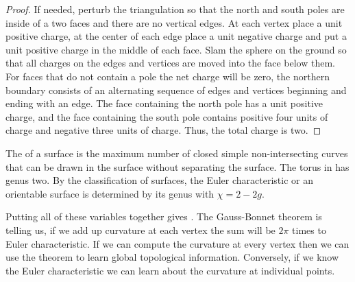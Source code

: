 \begin{proof}
If needed, perturb the triangulation so that the north and south poles are 
inside of a two faces and there are no vertical edges. At each vertex place a unit positive
charge, at the center of each edge place a unit negative charge and put a unit positive
charge in the middle of each face. Slam the sphere on the ground so that all charges
on the edges and vertices are moved into the face below them. For faces that do not contain a pole
the net charge will be zero, the northern boundary consists of an alternating sequence
of edges and vertices  beginning  and ending with an edge.
The face containing the north pole has a unit positive charge, and the face containing the south
pole contains positive four units of charge and negative three units of charge.
Thus, the total charge is two.

\end{proof}

The  of a surface is the maximum  number of closed simple
non-intersecting curves that can be drawn in the surface without separating
the surface.
The torus in  has genus two.
By the classification of surfaces, the Euler characteristic or an orientable surface
is determined by its genus with $\chi=2-2g$.

Putting all of these variables together gives .
The  Gauss-Bonnet theorem is  telling us, if we add up curvature
at each vertex the sum will be $2\pi$ times to Euler characteristic.
If we can compute the curvature at every vertex then we can use the theorem
to learn global topological information.
Conversely, if we know the Euler characteristic we can learn about the curvature
at individual points.
